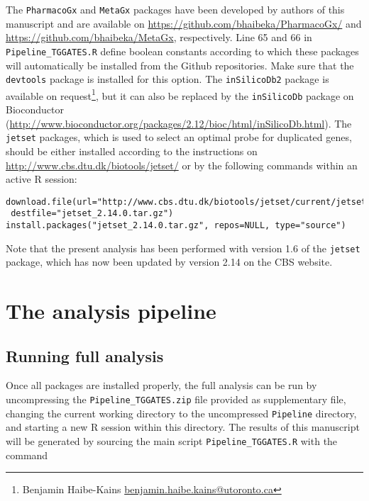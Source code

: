 \documentclass[a4paper,10pt]{scrartcl}
\begin{document}
The \verb+PharmacoGx+ and \verb+MetaGx+ packages have been developed by authors of this manuscript and are available on \url{https://github.com/bhaibeka/PharmacoGx/} and \url{https://github.com/bhaibeka/MetaGx}, respectively. Line 65 and 66 in \verb+Pipeline_TGGATES.R+ define boolean constants according to which these packages will automatically be installed from the Github repositories. Make sure that the \verb+devtools+ package is installed for this option. The \verb+inSilicoDb2+ package is available on request\footnote{Benjamin Haibe-Kains \url{benjamin.haibe.kains@utoronto.ca}}, but it can also be replaced by the \verb+inSilicoDb+ package on Bioconductor (\url{http://www.bioconductor.org/packages/2.12/bioc/html/inSilicoDb.html}). The \verb+jetset+ packages, which is used to select an optimal probe for duplicated genes, should be either installed according to the instructions on \url{http://www.cbs.dtu.dk/biotools/jetset/} or by the following commands within an active R session:

\begin{verbatim}
download.file(url="http://www.cbs.dtu.dk/biotools/jetset/current/jetset_2.14.0.tar.gz", 
 destfile="jetset_2.14.0.tar.gz")
install.packages("jetset_2.14.0.tar.gz", repos=NULL, type="source")
\end{verbatim}

Note that the present analysis has been performed with version 1.6 of the \verb+jetset+ package, which has now been updated by version 2.14 on the CBS website.

\section{The analysis pipeline}

\subsection{Running full analysis}

Once all packages are installed properly, the full analysis can be run by uncompressing the \verb+Pipeline_TGGATES.zip+ file provided as supplementary file, changing the current working directory to the uncompressed \verb+Pipeline+ directory, and starting a new R session within this directory. The results of this manuscript will be generated by sourcing the main script \verb+Pipeline_TGGATES.R+ with the command
\end{document}
